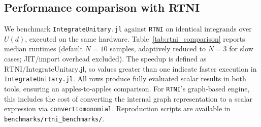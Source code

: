\documentclass[manuscript,screen]{acmart}
\begin{document}
\subsection{Performance comparison with RTNI}
\label{sec:rtni_comparison}
We benchmark \texttt{IntegrateUnitary.jl} against \texttt{RTNI} \cite{fukuda2019rtni} on
identical integrands over $U(d)$, executed on the same hardware.
Table~\ref{tab:rtni_comparison} reports median runtimes (default $N=10$
samples, adaptively reduced to $N=3$ for slow cases; JIT/import overhead
excluded). The speedup is defined as $\mathrm{RTNI} / \mathrm{IntegrateUnitary.jl}$, so
values greater than one indicate faster execution in \texttt{IntegrateUnitary.jl}.
All rows produce fully evaluated scalar results in both tools, ensuring an
apples-to-apples comparison. For \texttt{RTNI}'s graph-based engine, this
includes the cost of converting the internal graph representation to a scalar
expression via \texttt{converttomonomial}. Reproduction scripts are available
in \texttt{benchmarks/rtni\_benchmarks/}.
\end{document}
